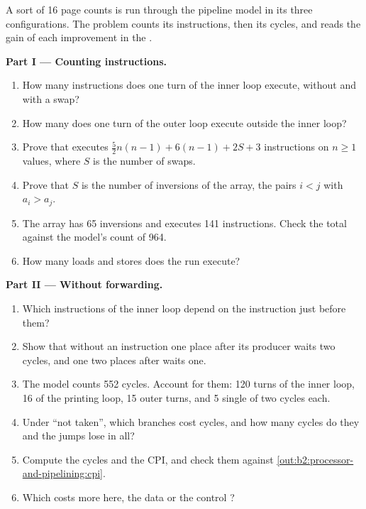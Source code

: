 \begin{problem}\label{pb:b2:processor-and-pipelining:1}
A  sort of 16 page counts is run through the pipeline model in its three configurations. The problem counts its
instructions, then its cycles, and reads the gain of each improvement in the .

\medskip\noindent\textbf{Part I --- Counting instructions.}\par\nopagebreak
{}
\begin{enumerate}
\item How many instructions does one turn of the inner loop execute, without and with a swap?
\item How many does one turn of the outer loop execute outside the inner loop?
\item Prove that  executes $\frac{5}{2}n(n-1) + 6(n-1) + 2S + 3$ instructions on $n \ge 1$ values, where
$S$ is the number of swaps.
\item Prove that $S$ is the number of inversions of the array, the pairs $i < j$ with $a_i > a_j$.
\item The array has 65 inversions and  executes 141 instructions. Check the total against the model's
count of 964.
\item How many loads and stores does the run execute?
\end{enumerate}

\medskip\noindent\textbf{Part II --- Without forwarding.}\par\nopagebreak
{}
\begin{enumerate}[resume, beginpenalty=10000]
\item Which instructions of the inner loop depend on the instruction just before them?
\item Show that without  an instruction one place after its producer waits two cycles, and one two places
after waits one.
\item The model counts 552  cycles. Account for them: 120 turns of the inner loop, 16 of the printing loop, 15
outer turns, and 5 single  of two cycles each.
\item Under ``not taken'', which branches cost cycles, and how many cycles do they and the jumps lose in all?
\item Compute the cycles and the CPI, and check them against \cref{out:b2:processor-and-pipelining:cpi}.
\item Which costs more here, the data  or the control ?
\end{enumerate}


\end{problem}

